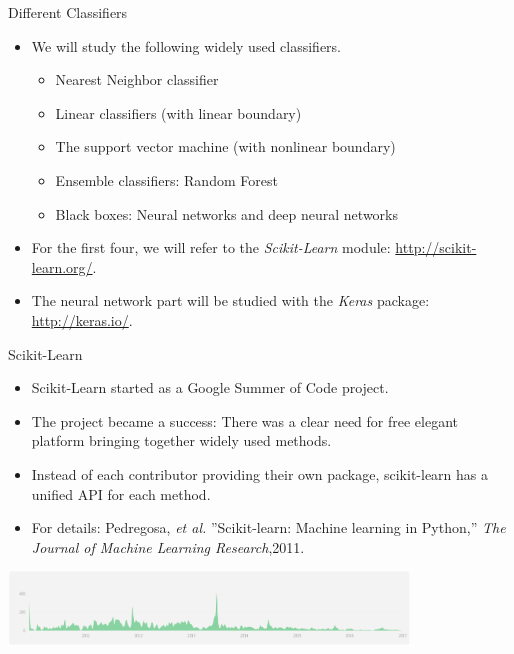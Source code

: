 \documentclass[10pt, aspectratio=169]{beamer} %
\begin{document}
\begin{frame}{Different Classifiers}
\begin{itemize}
\item We will study the following
widely used classifiers.
\begin{itemize}
\item Nearest Neighbor classifier
\item Linear classifiers (with linear boundary)
\item The support vector machine (with nonlinear boundary)
\item Ensemble classifiers: Random Forest
\item Black boxes: Neural networks and deep neural networks
\end{itemize}
\item For the first four, we will refer to the \emph{Scikit-Learn}
module: \url{http://scikit-learn.org/}.
\item The neural network part will be studied with the \emph{Keras} package: \url{http://keras.io/}.
\end{itemize}
\end{frame}


\begin{frame}{Scikit-Learn}
\begin{itemize}
\item Scikit-Learn started as a Google Summer of Code project.
\item The project became a success: There was a clear need for free elegant platform bringing together
widely used methods.
\item Instead of each contributor providing their own package, scikit-learn has a unified
API for each method.
\item For details: Pedregosa, \textit{et al.} ''Scikit-learn: Machine learning in Python,'' \textit{The Journal of Machine Learning Research},2011.
\end{itemize}
\centerline{\includegraphics[width=0.8\textwidth]{sklearn-pulse.png}}
\end{frame}
\end{document}
